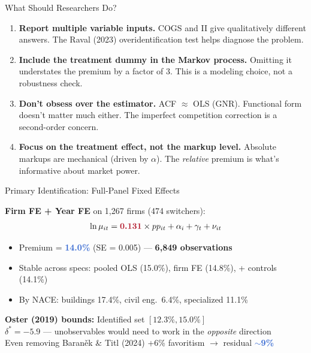 \documentclass[aspectratio=169,11pt]{beamer}
\newcommand{\accenttext}[1]{\textcolor{accent}{\textbf{#1}}}
\newcommand{\highlighttext}[1]{\textcolor{highlight}{\textbf{#1}}}
\begin{document}
\begin{frame}{What Should Researchers Do?}

\begin{enumerate}
    \item \textbf{Report multiple variable inputs.} COGS and II give qualitatively different answers. The Raval (2023) overidentification test helps diagnose the problem.

    \medskip

    \item \textbf{Include the treatment dummy in the Markov process.} Omitting it understates the premium by a factor of 3. This is a modeling choice, not a robustness check.

    \medskip

    \item \textbf{Don't obsess over the estimator.} ACF $\approx$ OLS (GNR). Functional form doesn't matter much either. The imperfect competition correction is a second-order concern.

    \medskip

    \item \textbf{Focus on the treatment effect, not the markup level.} Absolute markups are mechanical (driven by $\alpha$). The \emph{relative} premium is what's informative about market power.
\end{enumerate}

\end{frame}


\begin{frame}{Primary Identification: Full-Panel Fixed Effects}

\textbf{Firm FE + Year FE} on 1,267 firms (474 switchers):
$$\ln\mu_{it} = \highlighttext{0.131} \times pp_{it} + \alpha_i + \gamma_t + \nu_{it}$$

\pause
\medskip
\begin{itemize}
    \item Premium = \highlighttext{14.0\%} (SE = 0.005) --- \accenttext{6,849 observations}
    \item Stable across specs: pooled OLS (15.0\%), firm FE (14.8\%), + controls (14.1\%)
    \item By NACE: buildings 17.4\%, civil eng.\ 6.4\%, specialized 11.1\%
\end{itemize}

\pause
\medskip
\textbf{Oster (2019) bounds:} Identified set $[12.3\%, 15.0\%]$ \\
$\delta^* = -5.9$ --- unobservables would need to work in the \emph{opposite} direction \\
Even removing Baran\v{e}k \& Titl (2024) +6\% favoritism $\rightarrow$ residual \highlighttext{$\sim$9\%}

\end{frame}
\end{document}
